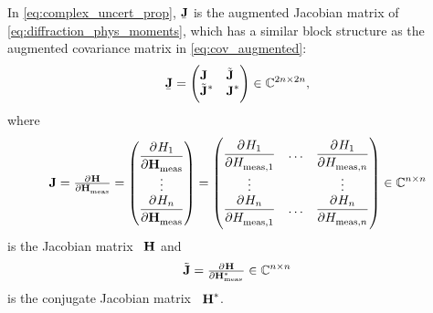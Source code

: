 In \cref{eq:complex_uncert_prop}, $\underaccent{\bar}{\mat{J}}$ is the
augmented Jacobian matrix of \cref{eq:diffraction_phys_moments}, which
has a similar block structure as the augmented covariance matrix in
\cref{eq:cov_augmented}:
\begin{equation}
  \label{eq:J_augmented}
  \underaccent{\bar}{\mat{J}}
  = \begin{pmatrix*}[l]
    \mat{J} & \tilde{\mat{J}} \\
    \tilde{\mat{J}}^* & \mat{J}^*
  \end{pmatrix*}
  \in \mathbb{C}^{2n \times 2n},
\end{equation}
where
\begin{equation}
  \mat{J}
  = \pd{\vect{H}}{\vect{H}_\text{meas}}
  = \begin{pmatrix}
    \dpd{H_1}{\vect{H}_\text{meas}} \\
    \vdots \\
    \dpd{H_n}{\vect{H}_\text{meas}}
  \end{pmatrix}
  = \begin{pmatrix}
    \dpd{H_1}{H_{\text{meas}, 1}} & \ldots & \dpd{H_1}{H_{\text{meas}, n}} \\
    \vdots & & \vdots \\
    \dpd{H_n}{H_{\text{meas}, 1}} & \ldots & \dpd{H_n}{H_{\text{meas}, n}}
  \end{pmatrix}
  \in \mathbb{C}^{n \times n}
\end{equation}
is the Jacobian matrix \wrt~$\bm{\mathrm{H}}$ and
\begin{equation}
  \tilde{\mat{J}}
  = \pd{\vect{H}}{{\vect{H}_\text{meas}^*}}
  \in \mathbb{C}^{n \times n}
\end{equation}
is the conjugate Jacobian matrix \wrt~$\bm{\mathrm{H}}^*$.

